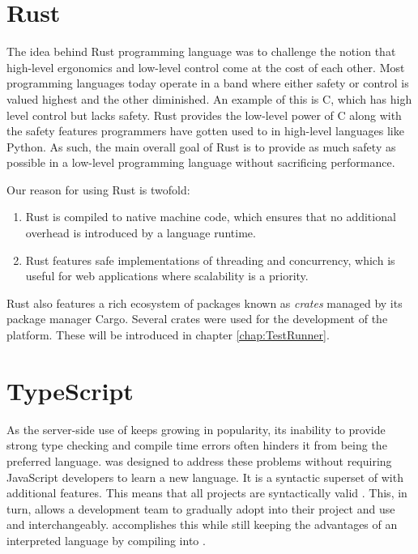 \section{Rust}
The idea behind Rust programming language was to challenge the notion that high-level ergonomics and low-level control come at the cost of each other\cite{Rust_Book}.
Most programming languages today operate in a band where either safety or control is valued highest and the other diminished. An example of this is C, which has high level control but lacks safety.
Rust provides the low-level power of C along with the safety features programmers have gotten used to in high-level languages like Python.
As such, the main overall goal of Rust is to provide as much safety as possible in a low-level programming language without sacrificing performance. \cite{Rust_in_Action}

Our reason for using Rust is twofold:
\begin{enumerate}
    \item Rust is compiled to native machine code, which ensures that no additional overhead is introduced by a language runtime.
    \item Rust features safe implementations of threading and concurrency, which is useful for web applications where scalability is a priority.
\end{enumerate}

Rust also features a rich ecosystem of packages known as \textit{crates} managed by its package manager Cargo\cite{Cargo}. Several crates were used for the development of the platform. These will be introduced in chapter \ref{chap:TestRunner}.

\section{TypeScript}
As the server-side use of \javascript{} keeps growing in popularity, its inability to provide strong type checking and compile time errors often hinders it from being the preferred language.
\typescript{} was designed to address these problems without requiring JavaScript developers to learn a new language.
It is a syntactic superset of \javascript{} with additional features.
This means that all \javascript{} projects are syntactically valid \typescript{}. This, in turn, allows a development team to gradually adopt \typescript{} into their project and use \typescript{} and \javascript{} interchangeably\cite{TypeScript}.
\typescript{} accomplishes this while still keeping the advantages of an interpreted language by compiling into \javascript{}. 

